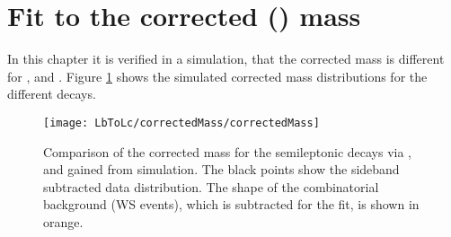 \section{Fit to the corrected \pKpi\mun (\Lb) mass}
\label{sec:FitCorrectedMass}
In this chapter it is verified in a simulation, that the corrected \pKpi\mun mass is different for \LbToLcmunu,  and .
Figure \ref{fig:correctedMass_normalisation} shows the simulated corrected \pKpi\mun mass distributions for the different decays.
\begin{figure}[hptb]
	\centering
	\texttt{[image: LbToLc/correctedMass/correctedMass]}
	\caption{Comparison of the \pKpi\mun corrected mass for the semileptonic \Lb decays via \Lc,  and  gained from simulation. The black points show the sideband subtracted data distribution. The shape of the combinatorial \Lc\mun background (WS events), which is
    subtracted for the fit, is shown in orange.}
	\label{fig:correctedMass_normalisation}
\end{figure}


